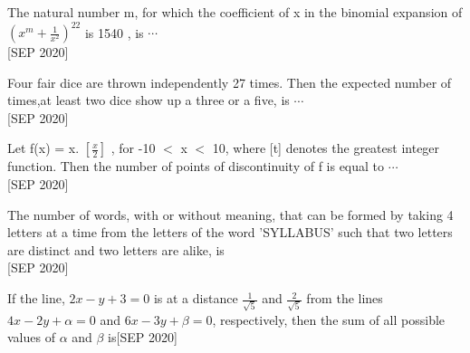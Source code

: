 \iffalse
  \title{Assignment}
  \author{ee24btech11030}
  \section{mcq-single}
\fi

\item The natural number m, for which the coefficient of x in the binomial expansion of ${\left(x^m + \frac{1}{x^2}\right)}^{22}$ is 1540 , is $\cdots$ \\\hfill{[SEP 2020]}
    \item Four fair dice are thrown independently 27 times. Then the expected number of times,at least two dice show up a three or a five, is $\cdots$ \\\hfill{[SEP 2020]}
    \item Let f(x) = x. $\left[\frac{x}{2}\right]$ , for -10 $<$ x $<$ 10, where [t] denotes the greatest integer function. Then the number of points of discontinuity of f is equal to $\cdots$ \\\hfill{[SEP 2020]}
    \item The number of words, with or without meaning, that can be formed by taking 4 letters at a time from the letters of the word 'SYLLABUS' such that two letters are distinct and two letters are alike, is \\\hfill{[SEP 2020]}
    \item If the line, $2x-y+3=0$ is at a distance $\frac{1}{\sqrt{5}}$ and $\frac{2}{\sqrt{5}}$ from the lines $4x - 2y + \alpha =0$ and $6x - 3y + \beta =0$, respectively, then the sum of all possible values of $\alpha$ and $\beta$ is\hfill{[SEP 2020]}
